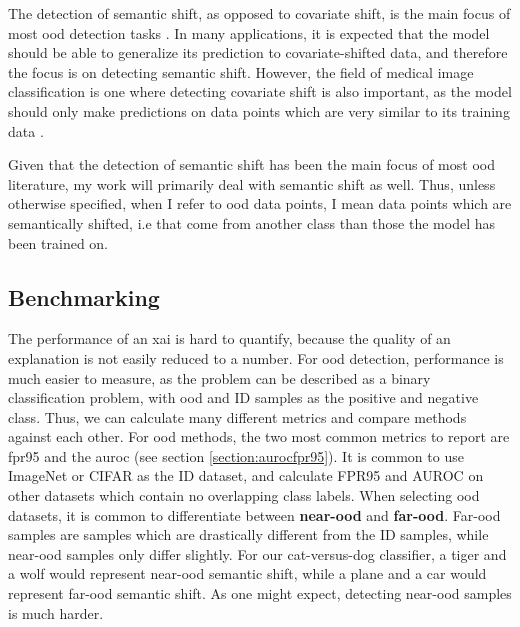 \documentclass[UKenglish]{uiomasterthesis} %
\theoremstyle{definition}
\begin{document}
The detection of semantic shift, as opposed to covariate shift, is the main focus of most \ac{ood} detection tasks \cite{oodoverview}. In many applications, it is expected that the model should be able to generalize its prediction to covariate-shifted data, and therefore the focus is on detecting semantic shift. However, the field of medical image classification is one where detecting covariate shift is also important, as the model should only make predictions on data points which are very similar to its training data \cite{oodoverview}.

Given that the detection of semantic shift has been the main focus of most \ac{ood} literature, my work will primarily deal with semantic shift as well. Thus, unless otherwise specified, when I refer to \ac{ood} data points, I mean data points which are semantically shifted, i.e that come from another class than those the model has been trained on.

\subsection{Benchmarking}

The performance of an \ac{xai} is hard to quantify, because the quality of an explanation is not easily reduced to a number. For \ac{ood} detection, performance is much easier to measure, as the problem can be described as a binary classification problem, with \ac{ood} and ID samples as the positive and negative class. Thus, we can calculate many different metrics and compare methods against each other. For \ac{ood} methods, the two most common metrics to report are \ac{fpr95} and the \ac{auroc} (see section \ref{section:aurocfpr95}). It is common to use ImageNet or CIFAR as the ID dataset, and calculate FPR95 and AUROC on other datasets which contain no overlapping class labels. When selecting \ac{ood} datasets, it is common to differentiate between \textbf{near-\ac{ood}} and \textbf{far-\ac{ood}}. Far-\ac{ood} samples are samples which are drastically different from the ID samples, while near-\ac{ood} samples only differ slightly. For our cat-versus-dog classifier, a tiger and a wolf would represent near-\ac{ood} semantic shift, while a plane and a car would represent far-\ac{ood} semantic shift. As one might expect, detecting near-\ac{ood} samples is much harder.

\end{document}
